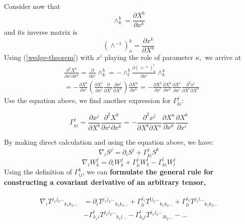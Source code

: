 Consider now that
$$
\wedge_{k}^{b}=\frac{\partial X^{b}}{\partial x^{k}}
$$
and its inverse matrix is
$$
\left(\wedge^{-1}\right)_{a}^{k}=\frac{\partial x^{k}}{\partial X^{a}}
$$
Using (\ref{wedge-theorem}) with $x^{i}$ playing the role of parameter $\kappa,$ we arrive at
\begin{equation}
\begin{aligned}
&\frac{\partial^{2} X^{b}}{\partial x^{i} \partial x^{k}}=\frac{\partial}{\partial x^{i}} \wedge_{k}^{b}=-\wedge_{l}^{b} \frac{\partial\left(\wedge^{-1}\right)_{a}^{l}}{\partial x^{i}} \wedge_{k}^{a}\\
&=-\frac{\partial X^{b}}{\partial x^{l}}\left(\frac{\partial X^{c}}{\partial x^{i}} \frac{\partial}{\partial X^{c}} \frac{\partial x^{l}}{\partial X^{a}}\right) \frac{\partial X^{a}}{\partial x^{k}}=-\frac{\partial X^{b}}{\partial x^{l}} \frac{\partial X^{a}}{\partial x^{k}} \frac{\partial X^{c}}{\partial x^{i}} \frac{\partial^{2} x^{l}}{\partial X^{c} \partial X^{a}}
\end{aligned}
\end{equation}
Use the equation above, we find another expression for $\Gamma_{ki}^j$:
\begin{qt}
\begin{equation}
\Gamma_{k i}^{j}=\frac{\partial x^{j}}{\partial X^{b}} \frac{\partial^{2} X^{b}}{\partial x^{i} \partial x^{k}}=-\frac{\partial^{2} x^{j}}{\partial X^{b} \partial X^{a}} \frac{\partial X^{a}}{\partial x^{k}} \frac{\partial X^{b}}{\partial x^{i}}
\label{gamma-defi}
\end{equation}
\end{qt}
By making direct calculation and using the equation above, we have:
\begin{equation}
\nabla_{i} S^{j}=\partial_{i} S^{j}+\Gamma_{k i}^{j} S^{k}
\end{equation}
\begin{equation}
\nabla_{i} W_{k}^{j}=\partial_{i} W_{k}^{j}+\Gamma_{l i}^{j} W_{k}^{l}-\Gamma_{k i}^{l} W_{l}^{j}
\end{equation}
Using the definition of $\Gamma_{ij}^k$, we can \textbf{formulate the general rule for constructing a covariant derivative of an arbitrary tensor,}
\begin{qt}
\begin{equation}
    \begin{split}
    \nabla_iT^{j_1j_2\dots}{}_{k_1k_2\dots}&=\partial_iT^{j_1j_2\dots}{}_{k_1k_2\dots}+\Gamma^{j_1}_{li}T^{lj_2\dots}{}_{k_1k_2\dots}+\Gamma^{j_2}_{li}T^{j_1l\dots}{}_{k_1k_2\dots}\\
    &-\Gamma^{l}_{k_1i}T^{j_1j_2\dots}{}_{k_1l\dots}-\Gamma^{l}_{k_2i}T^{j_1j_2\dots}{}_{lk_2\dots}-\dots
\end{split}
\end{equation}
\end{qt}
